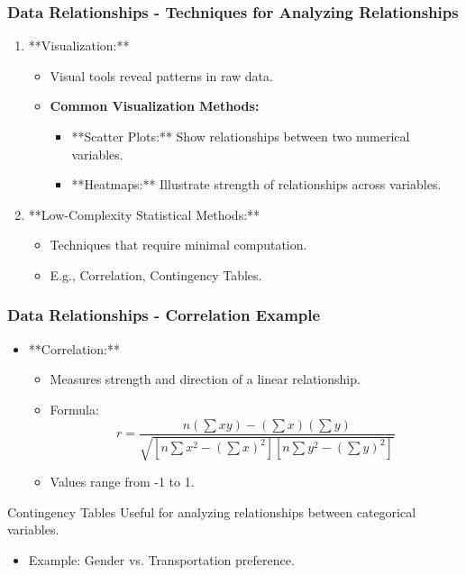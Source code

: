 \documentclass[aspectratio=169]{beamer}
\begin{document}
\begin{frame}[fragile]
  \frametitle{Data Relationships - Techniques for Analyzing Relationships}

  \begin{enumerate}
    \item **Visualization:**
      \begin{itemize}
        \item Visual tools reveal patterns in raw data.
        \item \textbf{Common Visualization Methods:}
          \begin{itemize}
            \item **Scatter Plots:** Show relationships between two numerical variables.
            \item **Heatmaps:** Illustrate strength of relationships across variables.
          \end{itemize}
      \end{itemize}

    \item **Low-Complexity Statistical Methods:**
      \begin{itemize}
        \item Techniques that require minimal computation.
        \item E.g., Correlation, Contingency Tables.
      \end{itemize}
  \end{enumerate}

\end{frame}

\begin{frame}[fragile]
  \frametitle{Data Relationships - Correlation Example}

  \begin{itemize}
    \item **Correlation:** 
      \begin{itemize}
        \item Measures strength and direction of a linear relationship.
        \item Formula: 
        \begin{equation}
        r = \frac{n(\sum xy) - (\sum x)(\sum y)}{\sqrt{[n\sum x^2 - (\sum x)^2][n\sum y^2 - (\sum y)^2]}}
        \end{equation}
        \item Values range from -1 to 1.
      \end{itemize}
  \end{itemize}

  \begin{block}{Contingency Tables}
    Useful for analyzing relationships between categorical variables.
    \begin{itemize}
      \item Example: Gender vs. Transportation preference.
    \end{itemize}
  \end{block}
  
\end{frame}
\end{document}
